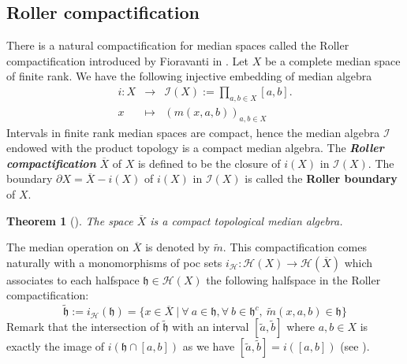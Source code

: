 \documentclass{amsart}
\numberwithin{equation}{section}
\newtheorem{thm}{Theorem}[section]
\newcommand{\HH}{\mathcal{H}}     %
\newcommand{\II}{\mathcal{I}}     %
\newcommand{\hh}{\mathfrak{h}}    %
\theoremstyle{definition}
\def\bar{\overline}
\begin{document}
\subsection{Roller compactification}\label{subsection_Roller}
There is a natural compactification for median spaces called the Roller compactification introduced by Fioravanti in \cite{Fior_median_property}. Let $X$ be a complete median space of finite rank. We have the following injective embedding of median algebra
\begin{eqnarray*}
i:X&\rightarrow& \II(X):=\prod_{a,b\in X}[a,b].\\
  x&\mapsto& (m(x,a,b))_{a,b\in X}
\end{eqnarray*}
Intervals in finite rank median spaces are compact, hence the median algebra $\II$ endowed with the product topology is a compact median algebra. The \textbf{\textit{Roller compactification}} $\bar{X}$ of $X$ is defined to be the closure of $i(X)$ in $\II(X)$. The boundary $\partial X = \bar{X} - i(X)$ of $i(X)$ in $\II(X)$ is called the \textbf{Roller boundary} of $X$.  
\begin{thm}[\cite{Fior_median_property}]
    The space $\bar{X}$ is a compact topological median algebra.
\end{thm}
The median operation on $\bar{X}$ is denoted by $\tilde{m}$. This compactification comes naturally with a monomorphisms of poc sets $i_\HH:\HH(X)\rightarrow\HH(\bar{X})$ which associates to each halfspace $\hh\in\HH(X)$ the following halfspace in the Roller compactification:
\[
\tilde{\hh}:=i_\HH(\hh)=\{x\in\bar{X}\ | \ \forall\ a\in \hh, \forall \ b\in \hh^c, \ \tilde{m}(x,a,b)\in\hh\}
\]
Remark that the intersection of $\tilde{\hh}$ with an interval $[\tilde{a},\tilde{b}]$ where $a,b\in X$ is exactly the image of $i(\hh\cap[a,b])$ as we have $[\tilde{a},\tilde{b}]=i([a,b])$ (see \cite[Corollary 4.4 (1)]{Fior_median_property}). 
\end{document}
